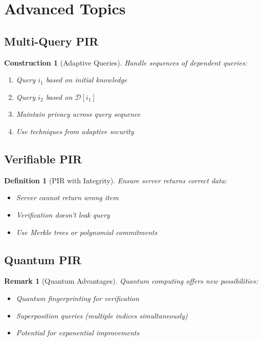 \documentclass[11pt,final,hidelinks]{article}
\newcommand{\DB}{\mathcal{D}}
\newtheorem{definition}[theorem]{Definition}
\newtheorem{remark}[theorem]{Remark}
\newtheorem{construction}[theorem]{Construction}
\begin{document}
\section{Advanced Topics}

\subsection{Multi-Query PIR}

\begin{construction}[Adaptive Queries]
Handle sequences of dependent queries:
\begin{enumerate}
    \item Query $i_1$ based on initial knowledge
    \item Query $i_2$ based on $\DB[i_1]$
    \item Maintain privacy across query sequence
    \item Use techniques from adaptive security
\end{enumerate}
\end{construction}

\subsection{Verifiable PIR}

\begin{definition}[PIR with Integrity]
Ensure server returns correct data:
\begin{itemize}
    \item Server cannot return wrong item
    \item Verification doesn't leak query
    \item Use Merkle trees or polynomial commitments
\end{itemize}
\end{definition}

\subsection{Quantum PIR}

\begin{remark}[Quantum Advantages]
Quantum computing offers new possibilities:
\begin{itemize}
    \item Quantum fingerprinting for verification
    \item Superposition queries (multiple indices simultaneously)
    \item Potential for exponential improvements
\end{itemize}
\end{remark}
\end{document}

